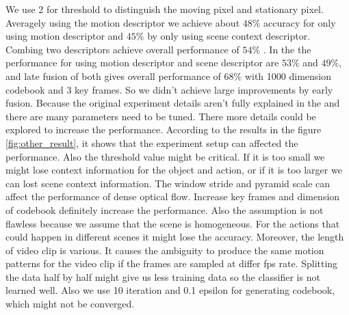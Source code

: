 \documentclass{sig-alternate-05-2015}
\begin{document}
We use 2 for threshold to distinguish the moving pixel and stationary pixel. Averagely using the motion descriptor we achieve about $48\%$ accuracy  for only using motion descriptor and $45\%$ by only using scene context descriptor. Combing two descriptors achieve overall performance of $54\%$ . In the \cite{Reddy:2013:RHA:2508580.2508584} the performance for using motion descriptor and scene descriptor are $53\%$ and $49\%$, and late fusion of both gives overall performance of $68\%$ with 1000 dimension codebook and 3 key frames. So we didn't achieve large improvements by early fusion. Because the original experiment details aren't fully explained in the \cite{Reddy:2013:RHA:2508580.2508584} and there are many parameters need to be tuned. There more details could be explored to increase the performance. According to the results in the figure \ref{fig:other_result}, it shows that the experiment setup can affected the performance. Also the threshold value might be critical. If it is too small we might lose context information for the object and action, or if it is too larger we can lost scene context information. The window stride and pyramid scale can affect the performance of dense optical flow. Increase key frames and dimension of codebook definitely increase the performance. Also the assumption is not flawless because we assume that the scene is homogeneous. For the actions that could happen in different scenes it might lose the accuracy. Moreover, the length of video clip is various. It causes the ambiguity to produce the same motion patterns for the video clip if the frames are sampled at differ fps rate. Splitting the data half by half might give us less training data so the classifier is not learned well. Also we use 10 iteration and 0.1 epsilon for generating codebook, which might not be converged. 
\end{document}
